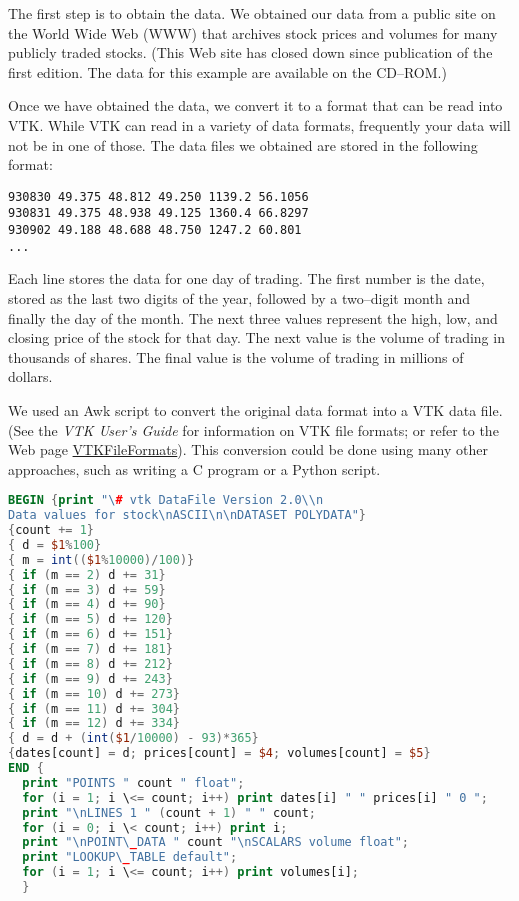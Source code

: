 The first step is to obtain the data. We obtained our data from a public site on the World Wide Web (WWW) that archives stock prices and volumes for many publicly traded stocks. (This Web site has closed down since publication of the first edition. The data for this example are available on the CD--ROM.)

Once we have obtained the data, we convert it to a format that can be read into VTK. While VTK can read in a variety of data formats, frequently your data will not be in one of those. The data files we obtained are stored in the following format:

\begin{lstlisting}[numbers=none]
930830 49.375 48.812 49.250 1139.2 56.1056
930831 49.375 48.938 49.125 1360.4 66.8297
930902 49.188 48.688 48.750 1247.2 60.801
...
\end{lstlisting}

\noindent Each line stores the data for one day of trading. The first number is the date, stored as the last two digits of the year, followed by a two--digit month and finally the day of the month. The next three values represent the high, low, and closing price of the stock for that day. The next value is the volume of trading in thousands of shares. The final value is the volume of trading in millions of dollars.

We used an Awk script to convert the original data format into a VTK data file. (See the \emph{VTK User's Guide} for information on VTK file formats; or refer to the Web page \href{https://lorensen.github.io/VTKExamples/site/VTKFileFormats/}{VTKFileFormats}). This conversion could be done using many other approaches, such as writing a C program or a Python script.

\begin{lstlisting}[language=Awk, caption={Awk: converting data file to VTK.}]
BEGIN {print "\# vtk DataFile Version 2.0\\n
Data values for stock\nASCII\n\nDATASET POLYDATA"}
{count += 1}
{ d = $1%100}
{ m = int(($1%10000)/100)}
{ if (m == 2) d += 31}
{ if (m == 3) d += 59}
{ if (m == 4) d += 90}
{ if (m == 5) d += 120}
{ if (m == 6) d += 151}
{ if (m == 7) d += 181}
{ if (m == 8) d += 212}
{ if (m == 9) d += 243}
{ if (m == 10) d += 273}
{ if (m == 11) d += 304}
{ if (m == 12) d += 334}
{ d = d + (int($1/10000) - 93)*365}
{dates[count] = d; prices[count] = $4; volumes[count] = $5}
END {
  print "POINTS " count " float";
  for (i = 1; i \<= count; i++) print dates[i] " " prices[i] " 0 ";
  print "\nLINES 1 " (count + 1) " " count;
  for (i = 0; i \< count; i++) print i;
  print "\nPOINT\_DATA " count "\nSCALARS volume float";
  print "LOOKUP\_TABLE default";
  for (i = 1; i \<= count; i++) print volumes[i];
  }
\end{lstlisting}

